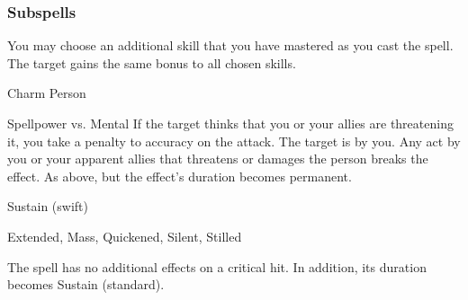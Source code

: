 \subsubsection{Subspells}
You may choose an additional skill that you have mastered as you cast the spell.
The target gains the same bonus to all chosen skills.
\begin{spellsection}{Charm Person}
\begin{spellheader}
\end{spellheader}
\begin{spellcontent}
\begin{spelltargetinginfo}
\end{spelltargetinginfo}
\begin{spelleffects}
\begin{spellattack}{Spellpower vs. Mental}
\spellspecial If the target thinks that you or your allies are threatening it, you take a  penalty to accuracy on the attack.
\spellsuccess
The target is \charmed by you.
Any act by you or your apparent allies that threatens or damages the  person breaks the effect.
\spellcritical As above, but the effect's duration becomes permanent.
\end{spellattack}
\spelldur Sustain (swift)
\end{spelleffects}
\end{spellcontent}
\begin{spellfooter}
 Extended, Mass, Quickened, Silent, Stilled
\end{spellfooter}
\begin{spellsubcontent}
\begin{spellcantrip}
The spell has no additional effects on a critical hit.
In addition, its duration becomes Sustain (standard).
\end{spellcantrip}
\end{spellsubcontent}
\end{spellsection}
